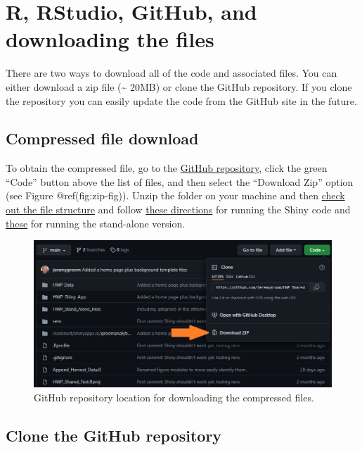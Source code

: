 \documentclass[
  openany]{book}
\begin{document}
\hypertarget{dnld-git}{%
\section{R, RStudio, GitHub, and downloading the files}\label{dnld-git}}

There are two ways to download all of the code and associated files. You
can either download a zip file (\textasciitilde{} 20MB) or clone the
GitHub repository. If you clone the repository you can easily update the
code from the GitHub site in the future.

\hypertarget{dnld-git-zip}{%
\subsection{Compressed file download}\label{dnld-git-zip}}

To obtain the compressed file, go to the
\href{https://github.com/jeremygroom/HWP-C-vR.git}{GitHub repository},
click the green ``Code'' button above the list of files, and then select
the ``Download Zip'' option (see Figure @ref(fig:zip-fig)). Unzip the
folder on your machine and then
\href{https://jeremygroom.github.io/HWP-vR-Documentation/run.html\#dnld-files}{check
out the file structure} and follow
\href{https://jeremygroom.github.io/HWP-vR-Documentation/run.html\#dnld-shiny}{these
directions} for running the Shiny code and
\href{https://jeremygroom.github.io/HWP-vR-Documentation/run.html\#dnld-sa}{these}
for running the stand-alone version.

\begin{figure}
\includegraphics[width=1\linewidth]{images/zip} \caption{GitHub repository location for downloading the compressed files.}\label{fig:zip-fig}
\end{figure}

\hypertarget{dnld-git-git}{%
\subsection{Clone the GitHub repository}\label{dnld-git-git}}
\end{document}
